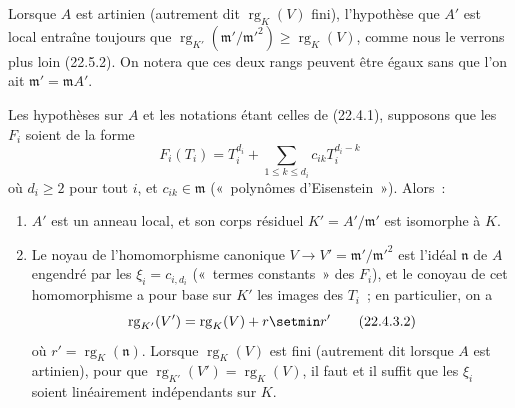 \begin{remark}[22.4.2]
\label{0.22.4.2-fr}
Lorsque $A$ est artinien (autrement dit $\operatorname{rg}_K(V)$ fini),
l'hypothèse que $A'$ est local entraîne toujours que
$\operatorname{rg}_{K'}(\mathfrak m'/\mathfrak m'^2)
\geqslant\operatorname{rg}_K(V)$, comme nous le verrons plus loin (22.5.2).
On notera que ces deux rangs peuvent être égaux sans que l'on ait
$\mathfrak m'=\mathfrak mA'$.
\end{remark}

\begin{proposition}[22.4.3]
\label{0.22.4.3-fr}
Les hypothèses sur $A$ et les notations étant celles de \textup{(22.4.1)}, supposons
que les $F_i$ soient de la forme
\begin{equation}
\label{0.22.4.3.1-fr}
  F_i(T_i)=T_i^{d_i}+\sum_{1\leqslant k\leqslant d_i}
  c_{ik}T_i^{d_i-k}
  \tag{22.4.3.1}
\end{equation}
où $d_i\geqslant2$ pour tout $i$, et $c_{ik}\in\mathfrak m$
(«~polynômes d'Eisenstein~»). Alors~:
\begin{enumerate}
  \item[\textup{(i)}] $A'$ est un anneau local, et son corps résiduel
  $K'=A'/\mathfrak m'$ est isomorphe à $K$.


  \item[\textup{(ii)}] Le noyau de l'homomorphisme canonique
  $V\to V'=\mathfrak m'/\mathfrak m'^2$ est l'idéal $\mathfrak n$ de $A$
  engendré par les $\xi_i=c_{i,d_i}$ («~termes constants~» des $F_i$), et
  le conoyau de cet homomorphisme a pour base sur $K'$ les images des $T_i$~;
  en particulier, on a
  \begin{equation}
  \label{0.22.4.3.2-fr}
    \operatorname{rg}_{K'}(V')=\operatorname{rg}_K(V)+r\setmin r'
    \tag{22.4.3.2}
  \end{equation}
  où $r'=\operatorname{rg}_K(\mathfrak n)$. Lorsque
  $\operatorname{rg}_K(V)$ est fini (autrement dit lorsque $A$ est
  artinien), pour que
  $\operatorname{rg}_{K'}(V')=\operatorname{rg}_K(V)$, il faut et il suffit
  que les $\xi_i$ soient linéairement indépendants sur $K$.
\end{enumerate}
\end{proposition}


